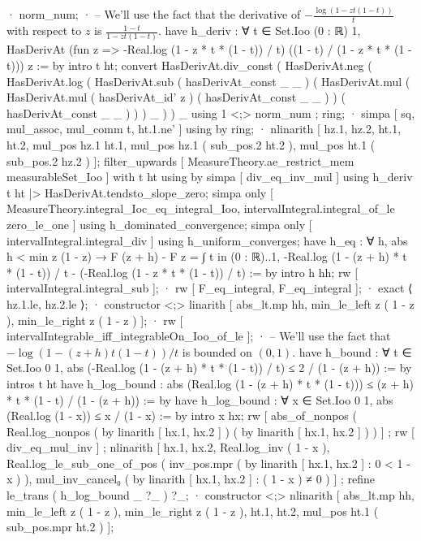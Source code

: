           · norm_num;
          · -- We'll use the fact that the derivative of $-\frac{\log(1 - z t (1 - t))}{t}$ with respect to $z$ is $\frac{1 - t}{1 - z t (1 - t)}$.
            have h_deriv : ∀ t ∈ Set.Ioo (0 : ℝ) 1, HasDerivAt (fun z => -Real.log (1 - z * t * (1 - t)) / t) ((1 - t) / (1 - z * t * (1 - t))) z := by
              intro t ht; convert HasDerivAt.div_const ( HasDerivAt.neg ( HasDerivAt.log ( HasDerivAt.sub ( hasDerivAt_const _ _ ) ( HasDerivAt.mul ( HasDerivAt.mul ( hasDerivAt_id' z ) ( hasDerivAt_const _ _ ) ) ( hasDerivAt_const _ _ ) ) ) _ ) ) _ using 1 <;> norm_num ; ring;
              · simpa [ sq, mul_assoc, mul_comm t, ht.1.ne' ] using by ring;
              · nlinarith [ hz.1, hz.2, ht.1, ht.2, mul_pos hz.1 ht.1, mul_pos hz.1 ( sub_pos.2 ht.2 ), mul_pos ht.1 ( sub_pos.2 hz.2 ) ];
            filter_upwards [ MeasureTheory.ae_restrict_mem measurableSet_Ioo ] with t ht using by simpa [ div_eq_inv_mul ] using h_deriv t ht |> HasDerivAt.tendsto_slope_zero;
        simpa only [ MeasureTheory.integral_Ioc_eq_integral_Ioo, intervalIntegral.integral_of_le zero_le_one ] using h_dominated_convergence;
      simpa only [ intervalIntegral.integral_div ] using h_uniform_converges;
    have h_eq : ∀ h, abs h < min z (1 - z) → F (z + h) - F z = ∫ t in (0 : ℝ)..1, -Real.log (1 - (z + h) * t * (1 - t)) / t - (-Real.log (1 - z * t * (1 - t)) / t) := by
      intro h hh;
      rw [ intervalIntegral.integral_sub ];
      · rw [ F_eq_integral, F_eq_integral ];
        · exact ⟨ hz.1.le, hz.2.le ⟩;
        · constructor <;> linarith [ abs_lt.mp hh, min_le_left z ( 1 - z ), min_le_right z ( 1 - z ) ];
      · rw [ intervalIntegrable_iff_integrableOn_Ioo_of_le ];
        · -- We'll use the fact that $-\log(1 - (z + h) t (1 - t)) / t$ is bounded on $(0, 1)$.
          have h_bound : ∀ t ∈ Set.Ioo 0 1, abs (-Real.log (1 - (z + h) * t * (1 - t)) / t) ≤ 2 / (1 - (z + h)) := by
            intros t ht
            have h_log_bound : abs (Real.log (1 - (z + h) * t * (1 - t))) ≤ (z + h) * t * (1 - t) / (1 - (z + h)) := by
              have h_log_bound : ∀ x ∈ Set.Ioo 0 1, abs (Real.log (1 - x)) ≤ x / (1 - x) := by
                intro x hx; rw [ abs_of_nonpos ( Real.log_nonpos ( by linarith [ hx.1, hx.2 ] ) ( by linarith [ hx.1, hx.2 ] ) ) ] ; rw [ div_eq_mul_inv ] ; nlinarith [ hx.1, hx.2, Real.log_inv ( 1 - x ), Real.log_le_sub_one_of_pos ( inv_pos.mpr ( by linarith [ hx.1, hx.2 ] : 0 < 1 - x ) ), mul_inv_cancel₀ ( by linarith [ hx.1, hx.2 ] : ( 1 - x ) ≠ 0 ) ] ;
              refine le_trans ( h_log_bound _ ?_ ) ?_;
              · constructor <;> nlinarith [ abs_lt.mp hh, min_le_left z ( 1 - z ), min_le_right z ( 1 - z ), ht.1, ht.2, mul_pos ht.1 ( sub_pos.mpr ht.2 ) ];
